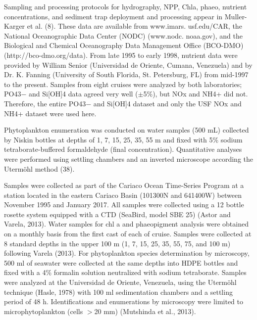 \documentclass[draft]{agujournal2019}
\begin{document}
    Sampling and processing protocols for hydrography, NPP, Chla, phaeo, nutrient concentrations, and sediment trap deployment and processing appear in Muller-Karger et al. (8). These data are available from www.imars. usf.edu/CAR, the National Oceanographic Data Center (NODC) (www.nodc. noaa.gov), and the Biological and Chemical Oceanography Data Management Office (BCO-DMO) (http://bco-dmo.org/data). From late 1995 to early 1998, nutrient data were provided by William Senior (Universidad de Oriente, Cumana, Venezuela) and by Dr. K. Fanning (University of South Florida, St. Petersburg, FL) from mid-1997 to the present. Samples from eight cruises were analyzed by both laboratories; PO43− and Si[OH]4 data agreed very well ($±$5\%), but NOx and NH4+ did not. Therefore, the entire PO43− and Si[OH]4 dataset and only the USF NOx and NH4+ dataset were used here.

    Phytoplankton enumeration was conducted on water samples (500 mL) collected by Niskin bottles at depths of 1, 7, 15, 25, 35, 55 m and fixed with 5\% sodium tetraborate-buffered formaldehyde (final concentration). Quantitative analyses were performed using settling chambers and an inverted microscope according the Utermöhl method (38).
    
    Samples were collected as part of the Cariaco Ocean Time-Series Program at a station located in the eastern Cariaco Basin (101300N and 641400W) between November 1995 and January 2017. All samples were collected using a 12 bottle rosette system equipped with a CTD (SeaBird, model SBE 25) (Astor and Varela, 2013). Water samples for chl a and phaeopigment analysis were obtained on a monthly basis from the first cast of each of cruise. Samples were collected at 8 standard depths in the upper 100 m (1, 7, 15, 25, 35, 55, 75, and 100 m) following Varela (2013). For phytoplankton species determination by microscopy, 500 ml of seawater were collected at the same depths into HDPE bottles and fixed with a 4\% formalin solution neutralized with sodium tetraborate. Samples were analyzed at the Universidad de Oriente, Venezuela, using the Utermöhl technique (Hasle, 1978) with 100 ml sedimentation chambers and a settling period of 48 h. Identifications and enumerations by microscopy were limited to microphytoplankton (cells $>$20 mm) (Mutshinda et al., 2013).
    
\end{document}
